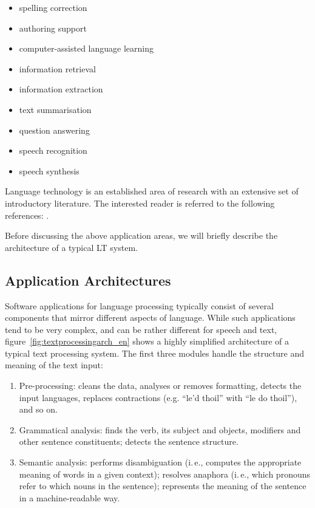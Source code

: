 \begin{multicols}{2}
\begin{itemize}
\item spelling correction
\item authoring support
\item computer-assisted language learning
\item information retrieval 
\item information extraction
\item text summarisation
\item question answering
\item speech recognition 
\item speech synthesis 
\end{itemize}

Language technology is an established area of research with an extensive set of introductory literature. The interested reader is referred to the following references: \cite{carstensen-etal1, jurafsky-martin01, manning-schuetze1, lt-world1, lt-survey1}. 

Before discussing the above application areas, we will briefly describe the architecture of a typical LT system.

\subsection{Application Architectures}

Software applications for language processing typically consist of several components that mirror different aspects of language. While such applications tend to be very complex, and can be rather different for speech and text, figure~\ref{fig:textprocessingarch_en} shows a highly simplified architecture of a typical text processing system. The first three modules handle the structure and meaning of the text input:

\begin{enumerate}
\item Pre-processing: cleans the data, analyses or removes formatting, detects the input languages, replaces contractions (e.g. ``le’d thoil'' with ``le do thoil''), and so on.
\item Grammatical analysis: finds the verb, its subject and objects, modifiers and other sentence constituents; detects the sentence structure.
\item Semantic analysis: performs disambiguation (i.\,e., computes the appropriate meaning of words in a given context); resolves anaphora (i.\,e., which pronouns refer to which nouns in the sentence); represents the meaning of the sentence in a machine-readable way.
\end{enumerate}


\end{multicols}
